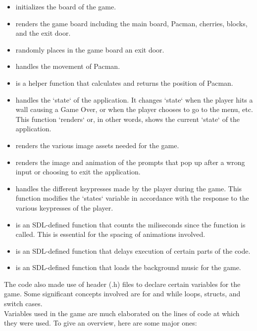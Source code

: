 \begin{itemize}[label={}]
    \item {} initializes the board of the game.
    \item {} renders the game board including the main board, Pacman, cherries, blocks, and the exit door.
    \item {} randomly places in the game board an exit door.
    \item {} handles the movement of Pacman.
    \item {} is a helper function that calculates and returns the position of Pacman.
    \item {} handles the `state` of the application. It changes `state` when the player hits a wall causing a Game Over, or when the player chooses to go to the menu, etc. This function `renders` or, in other words, shows the current `state` of the application.
    \item {} renders the various image assets needed for the game.
    \item {} renders the image and animation of the prompts that pop up after a wrong input or choosing to exit the application.
    \item {} handles the different keypresses made by the player during the game. This function modifies the `states` variable in accordance with the response to the various keypresses of the player.
    \item {} is an SDL-defined function that counts the miliseconds since the function is called. This is essential for the spacing of animations involved.
    \item {} is an SDL-defined function that delays execution of certain parts of the code.
    \item {} is an SDL-defined function that loads the background music for the game.
\end{itemize}


The code also made use of header (.h) files to declare certain variables for
the game. Some significant concepts involved are for and while loops, structs, and
switch cases.\\

Variables used in the game are much elaborated on the lines of code at which they were used. To give an overview, here are some major ones:\\

